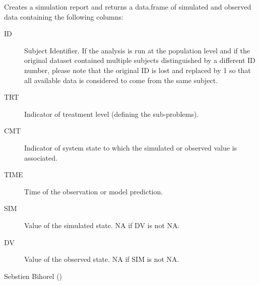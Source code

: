 \begin{Arguments}
\begin{ldescription}
\begin{description}
\end{description}


\end{ldescription}
\end{Arguments}
%
\begin{Value}
Creates a simulation report and returns a data.frame of simulated and observed
data containing the following columns: \begin{description}

\item[ID] Subject Identifier. If the analysis is run at the population level
and if the original dataset contained multiple subjects distinguished by
a different ID number, please note that the original ID is lost and 
replaced by 1 so that all available data is considered to come from the 
same subject.
\item[TRT] Indicator of treatment level (defining the sub-problems).
\item[CMT] Indicator of system state to which the simulated or observed 
value is associated.
\item[TIME] Time of the observation or model prediction.
\item[SIM] Value of the simulated state. NA if DV is not NA.
\item[DV] Value of the observed state. NA if SIM is not NA.

\end{description}

\end{Value}
%
\begin{Author}\relax
Sebstien Bihorel ()
\end{Author}
